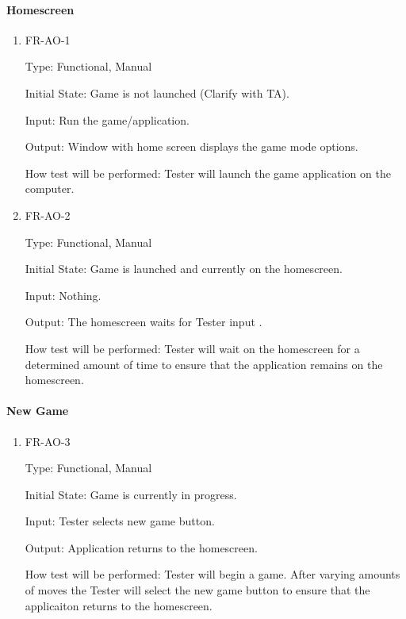 \documentclass[12pt, titlepage]{article}
\begin{document}
\paragraph{Homescreen}
\begin{enumerate}
    \item{FR-AO-1}
    
    Type: Functional, Manual
    
    Initial State: Game is not launched (Clarify with TA).
    					
    Input: Run the game/application.
    					
    Output: Window with home screen displays the game mode options.
    					
    How test will be performed: Tester will launch the game application on the computer. 
    \item{FR-AO-2}
    
    Type: Functional, Manual
    					
    Initial State: Game is launched and currently on the homescreen.
    					
    Input: Nothing.
    					
    Output: The homescreen waits for Tester input .
    					
    How test will be performed: Tester will wait on the homescreen for a determined amount of time to ensure that the application remains on the homescreen. 
\end{enumerate}

\paragraph{New Game}
\begin{enumerate}
    \item{FR-AO-3}
    
    Type: Functional, Manual
    
    Initial State: Game is currently in progress.
    					
    Input: Tester selects new game button.
    					
    Output: Application returns to the homescreen.
    					
    How test will be performed: Tester will begin a game. After varying amounts of moves the Tester will select the new game button to ensure that the applicaiton returns to the homescreen.
\end{enumerate}
\end{document}
